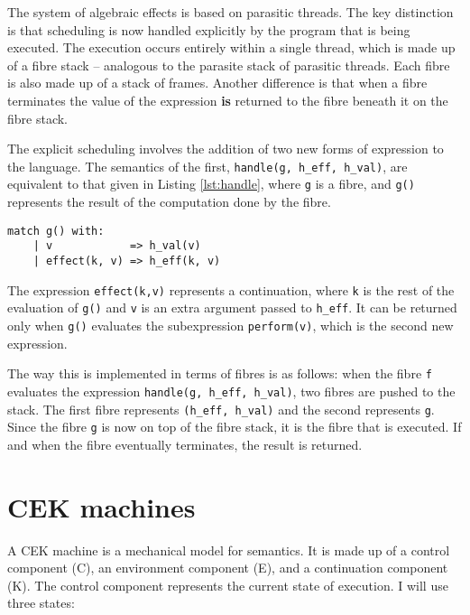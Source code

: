 \documentclass[12pt,a4paper,twoside,openright]{report}
\begin{document}
The system of algebraic effects is based on parasitic threads. The key distinction is that scheduling is now handled explicitly by the program that is being executed. The execution occurs entirely within a single thread, which is made up of a fibre stack -- analogous to the parasite stack of parasitic threads. Each fibre is also made up of a stack of frames. Another difference is that when a fibre terminates the value of the expression \textbf{is} returned to the fibre beneath it on the fibre stack.

The explicit scheduling involves the addition of two new forms of expression to the language. The semantics of the first, \texttt{handle(g, h\_eff, h\_val)}, are equivalent to that given in Listing \ref{lst:handle}, where \texttt{g} is a fibre, and \texttt{g()} represents the result of the computation done by the fibre.


\begin{minipage}{\linewidth} \begin{lstlisting}[caption=The semantics of \texttt{handle},label={lst:handle}]
  match g() with:
    | v            => h_val(v)
    | effect(k, v) => h_eff(k, v)
\end{lstlisting} \end{minipage}

The expression \texttt{effect(k,v)} represents a continuation, where \texttt{k} is the rest of the evaluation of \texttt{g()} and \texttt{v} is an extra argument passed to \texttt{h\_eff}. It can be returned only when \texttt{g()} evaluates the subexpression \texttt{perform(v)}, which is the second new expression.

The way this is implemented in terms of fibres is as follows: when the fibre \texttt{f} evaluates the expression \texttt{handle(g, h\_eff, h\_val)}, two fibres are pushed to the stack. The first fibre represents \texttt{(h\_eff, h\_val)} and the second represents \texttt{g}. Since the fibre \texttt{g} is now on top of the fibre stack, it is the fibre that is executed. If and when the fibre eventually terminates, the result is returned.

\section{CEK machines}\label{prepcek}

A CEK machine is a mechanical model for semantics. It is made up of a control component (C), an environment component (E), and a continuation component (K). The control component represents the current state of execution. I will use three states:
\end{document}
